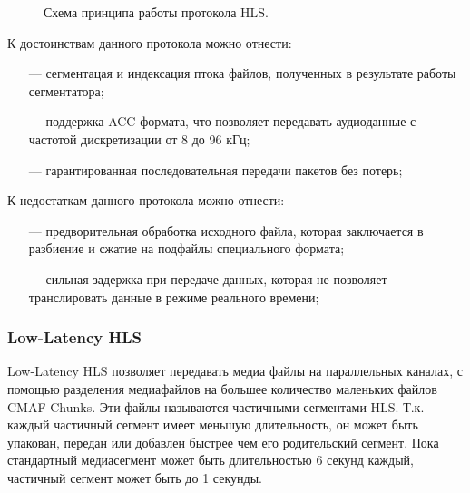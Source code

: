 		\begin{figure}[!h]
			\caption{Схема принципа работы протокола HLS.}
			\label{fig:hls}
		\end{figure}

		\par К достоинствам данного протокола можно отнести:
		\begin{itemize}[leftmargin=1.6\parindent]
			\item[---] сегментацая и индексация птока файлов, полученных в результате работы сегментатора;
			\item[---] поддержка ACC формата, что позволяет передавать аудиоданные с частотой дискретизации от 8 до 96 кГц;
			\item[---] гарантированная последовательная передачи пакетов без потерь;
		\end{itemize}

		\par К недостаткам данного протокола можно отнести:
		\begin{itemize}[leftmargin=1.6\parindent]
			\item[---] предворительная обработка исходного файла, которая заключается в разбиение и сжатие на подфайлы специального формата;
			\item[---] сильная задержка при передаче данных, которая не позволяет транслировать данные в режиме реального времени;
		\end{itemize}

	\subsubsection{Low-Latency HLS}

		\par Low-Latency HLS \cite{hls-ll} позволяет передавать медиа файлы на параллельных каналах, с помощью разделения медиафайлов на большее количество маленьких файлов CMAF Chunks. 
		Эти файлы называются частичными сегментами HLS. 
		Т.к. каждый частичный сегмент имеет меньшую длительность, он может быть упакован, передан или добавлен быстрее чем его родительский сегмент.
		Пока стандартный медиасегмент может быть длительностью 6 секунд каждый, частичный сегмент может быть до 1 секунды.


